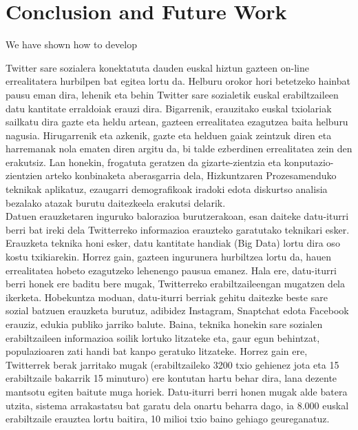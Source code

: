 \documentclass[information,article,submit,moreauthors,pdftex,10pt,a4paper]{Definitions/mdpi}
\begin{document}
\section{Conclusion and Future Work}
\label{sec:conclusion}

We have shown how to develop 

Twitter sare sozialera konektatuta dauden euskal hiztun gazteen on-line errealitatera hurbilpen bat egitea lortu da. Helburu orokor hori betetzeko hainbat pausu eman dira, lehenik eta behin Twitter sare sozialetik euskal erabiltzaileen datu kantitate erraldoiak erauzi dira. Bigarrenik, erauzitako euskal txiolariak sailkatu dira gazte eta heldu artean, gazteen errealitatea ezagutzea baita helburu nagusia. Hirugarrenik eta azkenik, gazte eta helduen gaiak zeintzuk diren eta harremanak nola ematen diren argitu da, bi talde ezberdinen errealitatea zein den erakutsiz. Lan honekin, frogatuta geratzen da gizarte-zientzia eta konputazio-zientzien arteko konbinaketa aberasgarria dela, Hizkuntzaren Prozesamenduko teknikak aplikatuz, ezaugarri demografikoak iradoki edota diskurtso analisia bezalako atazak burutu daitezkeela erakutsi delarik.\\
\indent Datuen erauzketaren inguruko balorazioa burutzerakoan, esan daiteke datu-iturri berri bat ireki dela Twitterreko informazioa erauzteko garatutako teknikari esker. Erauzketa teknika honi esker, datu kantitate handiak (Big Data) lortu dira oso kostu txikiarekin. Horrez gain, gazteen ingurunera hurbiltzea lortu da, hauen errealitatea hobeto ezagutzeko lehenengo pausua emanez. Hala ere, datu-iturri berri honek ere baditu bere mugak, Twitterreko erabiltzaileengan mugatzen dela ikerketa. Hobekuntza moduan, datu-iturri berriak gehitu daitezke beste sare sozial batzuen erauzketa burutuz, adibidez Instagram, Snaptchat edota Facebook erauziz, edukia publiko jarriko balute. Baina, teknika honekin sare sozialen erabiltzaileen informazioa soilik lortuko litzateke eta, gaur egun behintzat, populazioaren zati handi bat kanpo geratuko litzateke. Horrez gain ere, Twitterrek berak jarritako mugak (erabiltzaileko 3200 txio gehienez jota eta 15 erabiltzaile bakarrik 15 minuturo) ere kontutan hartu behar dira, lana dezente mantsotu egiten baitute muga horiek. Datu-iturri berri honen mugak alde batera utzita, sistema arrakastatsu bat garatu dela onartu beharra dago, ia 8.000 euskal erabiltzaile erauztea lortu baitira, 10 milioi txio baino gehiago geureganatuz.\\
\end{document}
